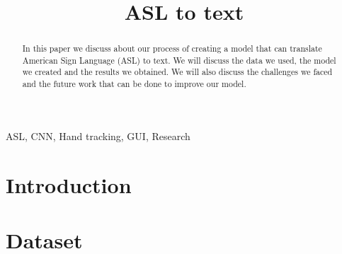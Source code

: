\documentclass[conference]{IEEEtran}
\begin{document}
    \title{ASL to text\\}

    \author{
    \and
    \and
    }

    \maketitle

    \begin{abstract}
        In this paper we discuss about our process of creating a model that can translate American Sign Language (ASL) to text.
        We will discuss the data we used, the model we created and the results we obtained.
        We will also discuss the challenges we faced and the future work that can be done to improve our model.
    \end{abstract}

    \begin{IEEEkeywords}
        ASL, CNN, Hand tracking, GUI, Research
    \end{IEEEkeywords}

    \section{Introduction}\label{sec:introduction}
    

    \section{Dataset}\label{sec:dataset}
    
\end{document}
